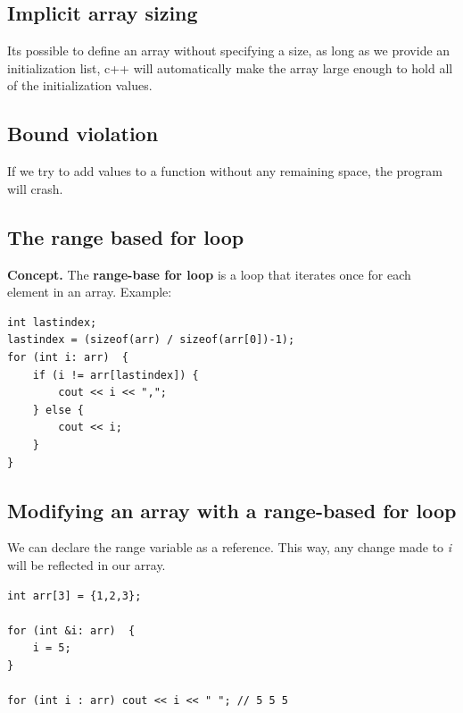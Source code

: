 \documentclass{report}
\begin{document}
   \bigbreak \noindent 
   \subsection{Implicit array sizing}
   \bigbreak \noindent 
   Its possible to define an array without specifying a size, as long as we provide an initialization list, c++ will automatically make the array large enough to hold all of the initialization values.

   \bigbreak \noindent 
   \subsection{Bound violation}
   \bigbreak \noindent 
   If we try to add values to a function without any remaining space, the program will crash.

   \pagebreak \bigbreak \noindent 
   \subsection{The range based for loop}
   \bigbreak \noindent 
   \textbf{Concept.} The \textbf{range-base for loop} is a loop that iterates once for each element in an array.
   \bigbreak \noindent 
   Example:
   \bigbreak \noindent 
   \sepline
    \begin{verbatim}
int lastindex;
lastindex = (sizeof(arr) / sizeof(arr[0])-1);
for (int i: arr)  {
    if (i != arr[lastindex]) {
        cout << i << ",";
    } else {
        cout << i;
    }
}
   \end{verbatim}
   \sepline

   \subsection{Modifying an array with a range-based for loop}
   \bigbreak \noindent 
   We can declare the range variable as a reference. This way, any change made to \textit{i} will be reflected in our array.
   \bigbreak \noindent 
   \sepline
   \begin{verbatim}
int arr[3] = {1,2,3};

for (int &i: arr)  {
    i = 5;
}

for (int i : arr) cout << i << " "; // 5 5 5
   \end{verbatim}
   \sepline

   \bigbreak \noindent 
\end{document}
